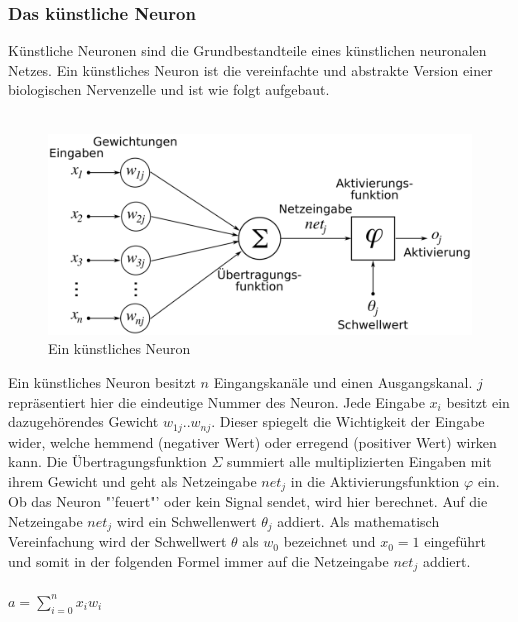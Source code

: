 \documentclass[12pt,oneside,a4paper,parskip]{scrbook}
\begin{document}
\subsubsection{Das künstliche Neuron}
Künstliche Neuronen sind die Grundbestandteile eines künstlichen neuronalen Netzes.
Ein künstliches Neuron ist die vereinfachte und abstrakte Version einer biologischen Nervenzelle und ist wie folgt aufgebaut.\\\\
\begin{figure}[h]
	\begin{center}
		\includegraphics[width=12cm]{Bilder/ArtificialNeuronModel_deutsch.png}
		\caption{Ein künstliches Neuron}
		\label{fig:wikiNeuron}
	\end{center}
\end{figure}
Ein künstliches Neuron besitzt $n$ Eingangskanäle und einen Ausgangskanal. $j$ repräsentiert hier die eindeutige Nummer des Neuron. Jede Eingabe $x_{i}$ besitzt ein dazugehörendes Gewicht $w_{1j}..w_{nj}$. Dieser spiegelt die Wichtigkeit der Eingabe wider, welche hemmend (negativer Wert) oder erregend (positiver Wert) wirken kann. Die Übertragungsfunktion $\Sigma$ summiert alle multiplizierten Eingaben mit ihrem Gewicht und geht als Netzeingabe $net_j$ in die Aktivierungsfunktion $\varphi$ ein. \\
Ob das Neuron "'feuert"' oder kein Signal sendet, wird hier berechnet. Auf die Netzeingabe $net_j$ wird ein Schwellenwert $\theta_j$ addiert. Als mathematisch Vereinfachung wird der Schwellwert $\theta$ als $w_0$ bezeichnet und $x_0 = 1$ eingeführt und somit in der folgenden Formel immer auf die Netzeingabe $net_j$ addiert.
\\\\
${\displaystyle a=\sum _{i=0}^{n}x_{i}w_{i}}$
\\\\
\end{document}
